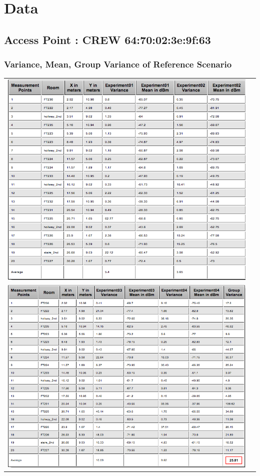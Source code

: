 \documentclass[11pt,a4paper,headinclude,footinclude,chapterprefix=on]{scrreprt}
\begin{document}
\chapter{Data} 
\section{Access Point : CREW 64:70:02:3e:9f:63} 
\subsection{Variance, Mean, Group Variance of Reference Scenario} 
\begin{longtable}
	{lr} 
	\includegraphics[width=15cm]{../../Source/plot/data/63_ref1.png} \\
	\includegraphics[width=15cm]{../../Source/plot/data/63_ref2.png} \\
\end{longtable}
\end{document}
